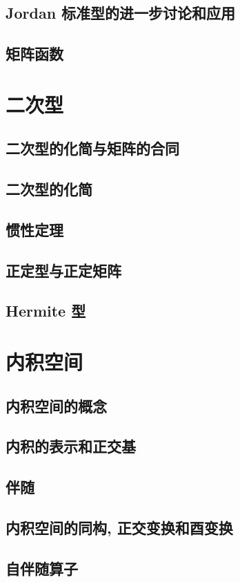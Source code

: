 \documentclass[a4paper, 11pt]{ctexbook}
\begin{document}
        \section{Jordan 标准型的进一步讨论和应用}
        \section{矩阵函数}
    \chapter{二次型}
        \section{二次型的化简与矩阵的合同}
        \section{二次型的化简}
        \section{惯性定理}
        \section{正定型与正定矩阵}
        \section{Hermite 型}
    \chapter{内积空间}
        \section{内积空间的概念}
        \section{内积的表示和正交基}
        \section{伴随}
        \section{内积空间的同构, 正交变换和酉变换}
        \section{自伴随算子}
\end{document}
